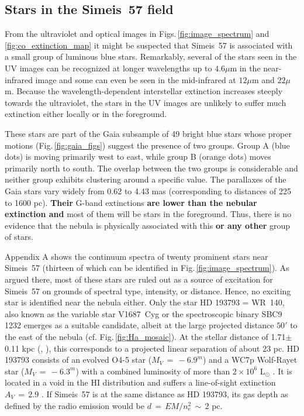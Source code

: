 \documentclass{aa}
\begin{document}
\subsection{Stars in the Simeis~57 field}

\par From the ultraviolet and optical images in
Figs.\,\ref{fig:image_spectrum} and \ref{fig:co_extinction_map} it
might be suspected that Simeis~57 is associated with a small group of
luminous blue stars. Remarkably, several of the stars seen in the UV
images can be recognized at longer wavelengths up to $4.6\mu$m in the
near-infrared image and some can even be seen in the mid-infrared at
$12\mu$m and $22\mu$m. Because the wavelength-dependent interstellar
extinction increases steeply towards the ultraviolet, the stars in the
UV images are unlikely to suffer much extinction either locally or in
the foreground.

These stars are part of the Gaia subsample of 49 bright blue stars
whose proper motions (Fig.\,\ref{fig:gaia_figs}) suggest the presence
of two groups.  Group A (blue dots) is moving primarily west to east,
while group B (orange dots) moves primarily north to south. The
overlap between the two groups is considerable and neither group
exhibits clustering around a specific value.  The parallaxes of the
Gaia stars vary widely from 0.62 to 4.43 mas (corresponding to
distances of 225 to 1600 pc). {\bf Their} G-band extinctions {\bf are
  lower than the nebular extinction and} most of them will be stars in
  the foreground. Thus, there is no evidence that the nebula is
  physically associated with this {\bf or any other} group of stars.

\par Appendix A shows the continuum spectra of twenty prominent stars
near Simeis~57 (thirteen of which can be identified in
Fig.\,\ref{fig:image_spectrum}). As argued there, most of these stars
are ruled out as a source of excitation for Simeis~57 on grounds of
spectral type, intensity, or distance. Hence, no exciting star is
identified near the nebula either. Only the star HD 193793 = WR~140,
also known as the variable star V1687~Cyg or the spectroscopic binary
SBC9 1232 \citep{Pourbaix2004} emerges as a suitable candidate, albeit
at the large projected distance $50'$ to the east of the nebula
(cf. Fig.\,\ref{fig:Ha_mosaic}).  At the stellar distance of
1.71$\pm$0.11 kpc (\cite{smith2012}, \cite{rate2020}), this
corresponds to a projected linear separation of about 23 pc. HD 193793
consists of an evolved O4-5 star ($M_V\,=\,-6.9^{m}$) and a WC7p
Wolf-Rayet star ($M_V\,=\,-6.3^{m}$) with a combined luminosity of
more than $2\times10^6$ L$_{\odot}$ \citep{Williams2011}. It is
located in a void in the HI distribution \citep{Arnal2001} and suffers
a line-of-sight extinction $A_V\,=\,2.9$ \citep{Williams2011}. If
Simeis~57 is at the same distance as HD 193793, its gas depth as
defined by the radio emission would be $d\,=\,EM/n_e^2\,\sim\,2$
pc. 
\end{document}
